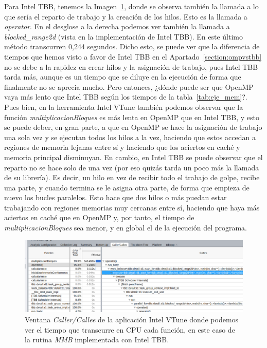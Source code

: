 \documentclass[a4paper,12pt]{article}
\begin{document}
Para Intel TBB, tenemos la Imagen~\ref{fig:vtune-tablatbb}, donde se observa también la llamada a lo que sería el reparto de trabajo y la creación de los hilos. Esto es la llamada a {\it operator}. En el desglose a la derecha podemos ver también la llamada a {\it blocked\_range2d} (vista en la implementación de Intel TBB). En este último método transcurren 0,244 segundos. Dicho esto, se puede ver que la diferencia de tiempos que hemos visto a favor de Intel TBB en el Apartado~\ref{section:ompvstbb} no se debe a la rapidez en crear hilos y la asignación de trabajo, pues Intel TBB tarda más, aunque es un tiempo que se diluye en la ejecución de forma que finalmente no se aprecia mucho. Pero entonces, ¿dónde puede ser que OpenMP vaya más lento que Intel TBB según los tiempos de la tabla~\ref{tab:eje_mem}?. Pues bien, en la herramienta Intel VTune también podemos observar que la función {\it multiplicacionBloques} es más lenta en OpenMP que en Intel TBB, y esto se puede deber, en gran parte, a que en OpenMP se hace la asignación de trabajo una sola vez y se ejecutan todos los hilos a la vez, haciendo que estos accedan a regiones de memoria lejanas entre sí y haciendo que los aciertos en caché y memoria principal disminuyan. En cambio, en Intel TBB se puede observar que el reparto no se hace solo de una vez (por eso quizás tarda un poco más la llamada de su librería). Es decir, un hilo en vez de recibir todo el trabajo de golpe, recibe una parte, y cuando termina se le asigna otra parte, de forma que empieza de nuevo los bucles paralelos. Esto hace que dos hilos o más puedan estar trabajando con regiones memorias muy cercanas entre sí, haciendo que haya más aciertos en caché que en OpenMP y, por tanto, el tiempo de {\it multiplicacionBloques} sea menor, y en global el de la ejecución del programa.


\begin{figure}[htbp]
    \includegraphics[scale=0.33]{./images/vtunetbbTabla.png}
    \centering
    \caption{ Ventana {\it Caller/Callee} de la aplicación Intel VTune donde podemos ver el tiempo que transcurre en CPU cada función, en este caso de la rutina {\it MMB} implementada con Intel TBB.}
    \label{fig:vtune-tablatbb}
\end{figure}
\end{document}
